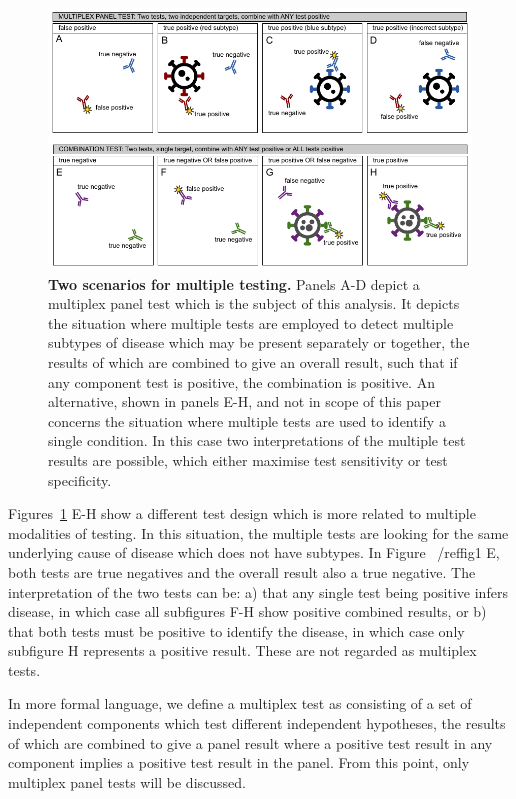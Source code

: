 \documentclass[10pt,letterpaper]{article}
\begin{document}
\begin{figure}[!h]
\centerline{\includegraphics{fig/fig1-testerror-v2.pdf}}
\caption{{\bf Two scenarios for multiple testing.}
Panels A-D depict a multiplex panel test which is the subject of this analysis. It depicts the situation where multiple tests are employed to detect multiple subtypes of disease which may be present separately or together, the results of which are combined to give an overall result, such that if any component test is positive, the combination is positive. An alternative, shown in panels E-H, and not in scope of this paper concerns the situation where multiple tests are used to identify a single condition. In this case two interpretations of the multiple test results are possible, which either maximise test sensitivity or test specificity.}
\label{fig1}
\end{figure}

Figures~\ref{fig1} E-H show a different test design which is more related to multiple modalities of testing\cite{weinstein2005}. In this situation, the multiple tests are looking for the same underlying cause of disease which does not have subtypes. In Figure ~/ref{fig1} E, both tests are true negatives and the overall result also a true negative. The interpretation of the two tests can be: a) that any single test being positive infers disease, in which case all subfigures F-H show positive combined results, or b) that both tests must be positive to identify the disease, in which case only subfigure H represents a positive result. These are not regarded as multiplex tests.

In more formal language, we define a multiplex test as consisting of a set of independent components which test different independent hypotheses, the results of which are combined to give a panel result where a positive test result in any component implies a positive test result in the panel. From this point, only multiplex panel tests will be discussed.
\end{document}
